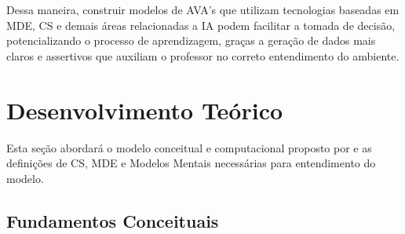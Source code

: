 \documentclass[
	oneside,
	12pt,				%
	a4paper,			%
	english,			%
	brazil,				%
	article
	]{abntex2}
\begin{document}
Dessa maneira, construir modelos de AVA's que utilizam tecnologias baseadas em MDE, CS e demais áreas relacionadas  a IA podem facilitar a tomada de decisão, potencializando o processo de aprendizagem, graças a geração de dados mais claros e assertivos que auxiliam o professor no correto entendimento do ambiente.


\section{Desenvolvimento Teórico}

Esta seção abordará o modelo conceitual e computacional proposto por  e as definições de CS, MDE e Modelos Mentais necessárias para entendimento do modelo.

\subsection{Fundamentos Conceituais}
\end{document}
